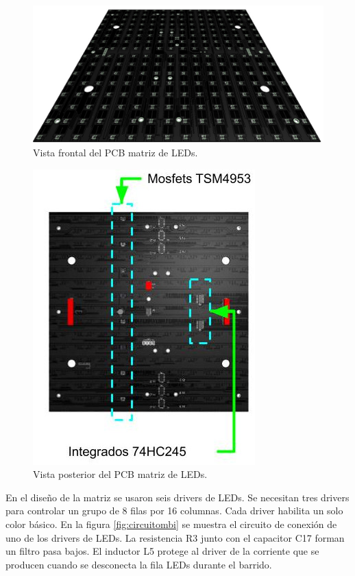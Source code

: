 \begin{figure}[htpb]
	\centering
	\includegraphics[scale=0.3]{Figures/pcbfullcolorfrontrender.jpg} 
	\caption{Vista frontal del PCB matriz de LEDs.}
	\label{fig:pcbrenderfront}
\end{figure}
\begin{figure}[htpb]
	\centering
	\includegraphics[scale=4]{Figures/pcbfullcolorbackrender.jpg} 
	\caption{Vista posterior del PCB matriz de LEDs.}
	\label{fig:pcbrenderback}
\end{figure}

En el diseño de la matriz se usaron seis drivers de LEDs. Se necesitan tres drivers para controlar un grupo de 8 filas por 16 columnas. Cada driver habilita un solo color básico. En la figura \ref{fig:circuitombi} se muestra el circuito de conexión de uno de los drivers de LEDs. La resistencia R3 junto con el capacitor C17 forman un filtro pasa bajos. El inductor L5 protege al driver de la corriente que se producen cuando se desconecta la fila LEDs durante el barrido. 


